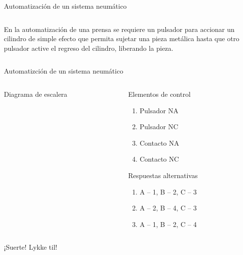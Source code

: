 \documentclass[presentation,aspectratio=169, usenames, dvipsnames]{beamer}
\newcommand*{\coil}[1]{to[short] ++(0.5, 0) node[coordinate] (orig) {} arc [start angle=180, end angle=150,radius=8mm] (orig) arc [start angle=180, end angle=210,radius=8mm] (orig) ++(1cm, 0) node[coordinate] (coilend) {} arc [start angle=0, end angle=30,radius=8mm] (coilend) arc [start angle=0, end angle=-30,radius=8mm] (coilend) to[short] ++(0.5cm, 0) (orig) ++(0.5, 0.8) node {#1}}
\begin{document}
\begin{frame}[label={sec:org1137851}]{Automatización de un sistema neumático}
\begin{columns}
\begin{column}{0.6\columnwidth}
En la automatización de una prensa se requiere un pulsador para accionar un cilindro de simple efecto que permita sujetar una pieza metálica hasta que otro pulsador active el regreso del cilindro, liberando la pieza.
\end{column}
\end{columns}
\end{frame}

\begin{frame}[label={sec:orgb7cb80c}]{Automatizción de un sistema neumático}
\begin{columns}
\begin{column}{0.6\columnwidth}
Diagrama de escalera
\begin{center}
\end{center}
\end{column}
\begin{column}{0.4\columnwidth}
\pause

Elementos de control

\begin{enumerate}
\item Pulsador NA
\item Pulsador NC
\item Contacto NA
\item Contacto NC
\end{enumerate}

Respuestas alternativas

\begin{enumerate}
\item A -- 1, B -- 2, C -- 3
\item A -- 2, B -- 4, C -- 3
\item A -- 1, B -- 2, C -- 4
\end{enumerate}
\end{column}
\end{columns}
\end{frame}

\begin{frame}[label={sec:orgda063de}]{¡Suerte!}
\Huge Lykke til!
\end{frame}
\end{document}

